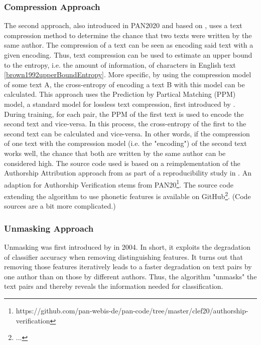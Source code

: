 
\subsubsection{Compression Approach}
The second approach, also introduced in PAN2020 and based on \cite{teahan2003compression}, uses a text compression method to determine the chance that two texts were written by the same author.
The compression of a text can be seen as encoding said text with a given encoding.
Thus, text compression can be used to estimate an upper bound to the entropy, i.e. the amount of information, of characters in English text \ref{brown1992upperBoundEntropy}.
More specific, by using the compression model of some text A, the cross-entropy of encoding a text B with this model can be calculated.
This approach uses the Prediction by Partical Matching (PPM) model, a standard model for lossless text compression, first introduced by \cite{cleary1984PPM}.
During training, for each pair, the PPM of the first text is used to encode the second text and vice-versa.
In this process, the cross-entropy of the first to the second text can be calculated and vice-versa.
In other words, if the compression of one text with the compression model (i.e. the "encoding") of the second text works well, the chance that both are written by the same author can be considered high.
The source code used is based on a reimplementation of the Authorship Attribution approach from \cite{teahan2003compression} as part of a reproducibility study in \cite{potthast2016reimplementation}.
An adaption for Authorship Verification stems from PAN20\footnote{https://github.com/pan-webis-de/pan-code/tree/master/clef20/authorship-verification}.
The source code extending the algorithm to use phonetic features is available on GitHub\footnote{...}. (Code sources are a bit more complicated.)

\subsubsection{Unmasking Approach}
Unmasking was first introduced by \cite{koppel2004unmasking} in 2004.
In short, it exploits the degradation of classifier accuracy when removing distinguishing features.
It turns out that removing those features iteratively leads to a faster degradation on text pairs by one author than on those by different authors.
Thus, the algorithm "unmasks" the text pairs and thereby reveals the information needed for classification.\\

